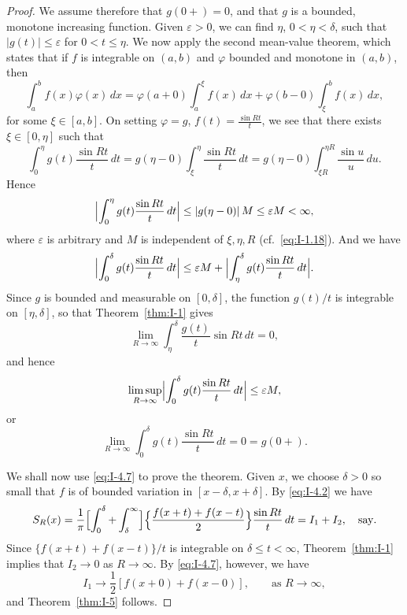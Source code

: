 \begin{proof}
We assume therefore that $g(0+)=0$, and that $g$ is a bounded, monotone increasing function. Given $\varepsilon>0$, we can find $\eta$, $0<\eta<\delta$, such that $|g(t)|\le\varepsilon$ for $0<t\le\eta$. We now apply the second mean-value theorem, which states that if $f$ is integrable on $(a,b)$ and $\varphi$ bounded and monotone in $(a,b)$, then
\begin{equation*}
\int_a^b f(x)\varphi(x)\,dx
=\varphi(a+0)\int_a^\xi f(x)\,dx+\varphi(b-0)\int_\xi^b f(x)\,dx,
\end{equation*}
for some $\xi\in[a,b]$. On setting $\varphi=g$, $f(t)=\frac{\sin Rt}{t}$, we see that there exists $\xi\in[0,\eta]$ such that
\begin{equation*}
\int_0^\eta g(t)\frac{\sin Rt}{t}\,dt
=g(\eta-0)\int_\xi^\eta\frac{\sin Rt}{t}\,dt
=g(\eta-0)\int_{\xi R}^{\eta R}\frac{\sin u}{u}\,du.
\end{equation*}
Hence
\begin{equation*}
\Bigl|\int_0^\eta g(t)\frac{\sin Rt}{t}\,dt\Bigr|
\le|g(\eta-0)|\,M\le\varepsilon M<\infty,
\end{equation*}
where $\varepsilon$ is arbitrary and $M$ is independent of $\xi,\eta,R$ (cf.\ \eqref{eq:I-1.18}). And we have
\begin{equation*}
\Bigl|\int_0^\delta g(t)\frac{\sin Rt}{t}\,dt\Bigr|
\le\varepsilon M+\Bigl|\int_\eta^\delta g(t)\frac{\sin Rt}{t}\,dt\Bigr|.
\end{equation*}
Since $g$ is bounded and measurable on $[0,\delta]$, the function $g(t)/t$ is integrable on $[\eta,\delta]$, so that Theorem~\ref{thm:I-1} gives
\begin{equation*}
\lim_{R\to\infty}\int_\eta^\delta\frac{g(t)}{t}\sin Rt\,dt=0,
\end{equation*}
and hence
\begin{equation*}
\limsup_{R\to\infty}\Bigl|\int_0^\delta g(t)\frac{\sin Rt}{t}\,dt\Bigr|\le\varepsilon M,
\end{equation*}
or
\begin{equation*}
\lim_{R\to\infty}\int_0^\delta g(t)\frac{\sin Rt}{t}\,dt=0=g(0+).
\end{equation*}

We shall now use \eqref{eq:I-4.7} to prove the theorem. Given $x$, we choose $\delta>0$ so small that $f$ is of bounded variation in $[x-\delta,x+\delta]$. By \eqref{eq:I-4.2} we have
\begin{equation*}
S_R(x)=\frac{1}{\pi}\Bigl[\int_0^\delta+\int_\delta^\infty\Bigr]
\Bigl\{\frac{f(x+t)+f(x-t)}{2}\Bigr\}\frac{\sin Rt}{t}\,dt
=I_1+I_2,\quad\text{say}.
\end{equation*}
Since $\{f(x+t)+f(x-t)\}/t$ is integrable on $\delta\le t<\infty$, Theorem~\ref{thm:I-1} implies that $I_2\to 0$ as $R\to\infty$. By \eqref{eq:I-4.7}, however, we have
\begin{equation*}
I_1\to\frac12[f(x+0)+f(x-0)],\qquad\text{as }R\to\infty,
\end{equation*}
and Theorem~\ref{thm:I-5} follows.
\end{proof}

